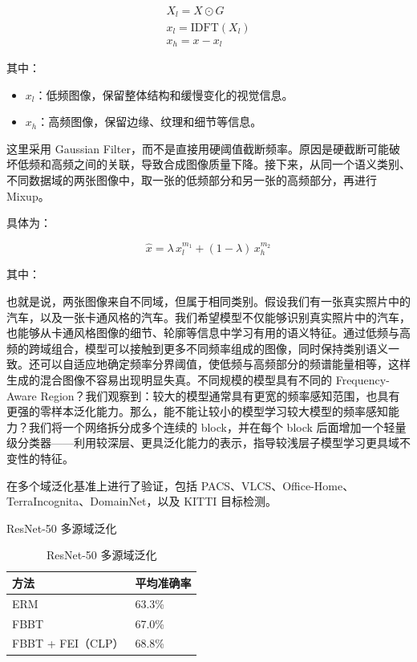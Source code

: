 \[
\begin{gathered}X_l=X\odot G \\ x_l=\mathrm{IDFT}(X_l) \\ x_h=x-x_l\end{gathered}
\]

其中：

\begin{itemize}
  \item $x_l$：低频图像，保留整体结构和缓慢变化的视觉信息。
  \item $x_h$：高频图像，保留边缘、纹理和细节等信息。
\end{itemize}

这里采用 Gaussian Filter，而不是直接用硬阈值截断频率。原因是硬截断可能破坏低频和高频之间的关联，导致合成图像质量下降。接下来，从同一个语义类别、不同数据域的两张图像中，取一张的低频部分和另一张的高频部分，再进行 Mixup。

具体为：

\[
\hat{x}=\lambda\,x_l^{m_1}+(1-\lambda)\,x_h^{m_2}
\]

其中：

也就是说，两张图像来自不同域，但属于相同类别。假设我们有一张真实照片中的汽车，以及一张卡通风格的汽车。我们希望模型不仅能够识别真实照片中的汽车，也能够从卡通风格图像的细节、轮廓等信息中学习有用的语义特征。通过低频与高频的跨域组合，模型可以接触到更多不同频率组成的图像，同时保持类别语义一致。还可以自适应地确定频率分界阈值，使低频与高频部分的频谱能量相等，这样生成的混合图像不容易出现明显失真。不同规模的模型具有不同的 Frequency-Aware Region？我们观察到：较大的模型通常具有更宽的频率感知范围，也具有更强的零样本泛化能力。那么，能不能让较小的模型学习较大模型的频率感知能力？我们将一个网络拆分成多个连续的 block，并在每个 block 后面增加一个轻量级分类器——利用较深层、更具泛化能力的表示，指导较浅层子模型学习更具域不变性的特征。

在多个域泛化基准上进行了验证，包括 PACS、VLCS、Office-Home、TerraIncognita、DomainNet，以及 KITTI 目标检测。

ResNet-50 多源域泛化

\begin{table}[H]\centering
\caption*{ResNet-50 多源域泛化}
\begin{tabular}{ll}\toprule
\textbf{方法} & \textbf{平均准确率} \\ \midrule
ERM & 63.3\% \\
FBBT & 67.0\% \\
FBBT + FEI（CLP） & 68.8\% \\
\bottomrule\end{tabular}
\end{table}

